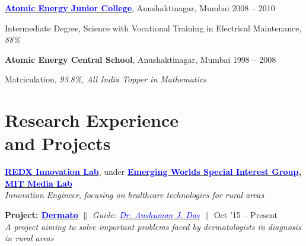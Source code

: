 \documentclass[margin,line]{res}
\newenvironment{list1}{
  \begin{list}{\ding{113}}{%
      \setlength{\itemsep}{0in}
      \setlength{\parsep}{0in} \setlength{\parskip}{0in}
      \setlength{\topsep}{0in} \setlength{\partopsep}{0in} 
      \setlength{\leftmargin}{0.17in}}}{\end{list}}
\begin{document}
\begin{resume}
\vspace*{-0.1in}

{\bf \href{http://www.aejcmumbai.ac.in/}{\textcolor{blue}{Atomic Energy Junior College}}}, Anushaktinagar, Mumbai \hfill {2008 -- 2010} \\
\vspace*{-.15in}
\begin{list1}
\item[] Intermediate Degree, Science with Vocational Training in Electrical Maintenance, \textit{88\%}
\end{list1}

\vspace*{-0.1in}

{\bf Atomic Energy Central School}, Anushaktinagar, Mumbai \hfill {1998 -- 2008} \\
\vspace*{-.15in}
\begin{list1}
\item[] Matriculation, \textit{93.8\%}, \textit{All India Topper in Mathematics}
\end{list1}

\section{\sc Research Experience \\ and Projects} 

{\bf  \href{http://redxmumbai.com/}{\textcolor{blue}{REDX Innovation Lab}}}, under {\bf \href{http://mitemergingworlds.com/}{\textcolor{blue}{Emerging Worlds Special Interest Group}}, \href{https://www.media.mit.edu}{\textcolor{blue} {MIT Media Lab}}} \\
{\em Innovation Engineer}, {\em focusing on healthcare technologies for rural areas} \\
\vspace*{-.05in}
\begin{list1}
\item[]\textbf{Project: \href{http://dermato.io/}{\textcolor{blue} {Dermato}}} \hfill $\|$ \hfill {\em Guide: \href{http://www.mit.edu/~ajdas}{\textcolor{blue} {Dr. Anshuman J. Das}}} \hfill $\|$ \hfill {Oct '15 -- Present} \\
\textit{A project aiming to solve important problems faced by dermatologists in diagnosis in rural areas}
\vspace{4pt}


\end{list1}
\end{resume}
\end{document}

